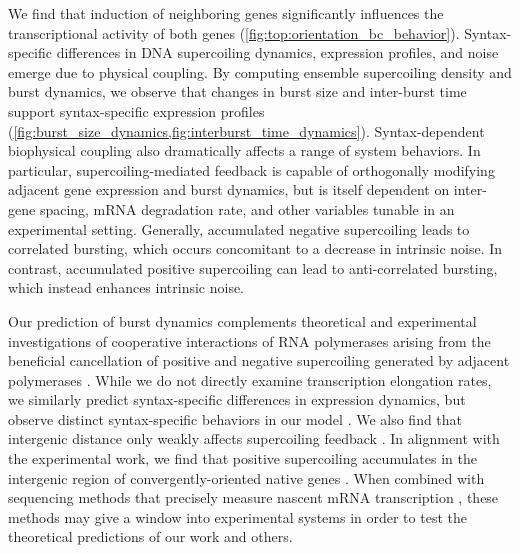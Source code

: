 \documentclass[11pt]{article}
\begin{document}
We find that induction of neighboring genes significantly influences the transcriptional activity of both genes (\cref{fig:top:orientation_bc_behavior}). Syntax-specific differences in DNA supercoiling dynamics, expression profiles, and noise emerge due to physical coupling. By computing ensemble supercoiling density and burst dynamics, we observe that changes in burst size and inter-burst time support syntax-specific expression profiles (\cref{fig:burst_size_dynamics,fig:interburst_time_dynamics}). Syntax-dependent biophysical coupling also dramatically affects a range of system behaviors. In particular, supercoiling-mediated feedback is capable of orthogonally modifying adjacent gene expression and burst dynamics, but is itself dependent on inter-gene spacing, mRNA degradation rate, and other variables tunable in an experimental setting. Generally, accumulated negative supercoiling leads to correlated bursting, which occurs concomitant to a decrease in intrinsic noise. In contrast, accumulated positive supercoiling can lead to anti-correlated bursting, which instead enhances intrinsic noise.

Our prediction of burst dynamics complements theoretical and experimental investigations of cooperative interactions of RNA polymerases arising from the beneficial cancellation of positive and negative supercoiling generated by adjacent polymerases \parencite{sevierCollectivePolymeraseDynamics2022,kimLongDistanceCooperativeAntagonistic2019}.
While we do not directly examine transcription elongation rates, we similarly predict syntax-specific differences in expression dynamics, but observe distinct syntax-specific behaviors in our model \parencite{sevierCollectivePolymeraseDynamics2022,tripathiDNASupercoilingmediatedCollective2021}.  We also find that intergenic distance only weakly affects supercoiling feedback \textcite{tripathiDNASupercoilingmediatedCollective2021}.
 In alignment with the experimental work, we find that  positive supercoiling accumulates in the intergenic region of convergently-oriented native genes \parencite{guoHighresolutionGenomewideMapping2021}. When combined with sequencing methods that precisely measure nascent mRNA transcription \parencite{mellorInterleavedGenome2016}, these methods may give a window into experimental systems in order to test the theoretical predictions of our work and others.
\end{document}
